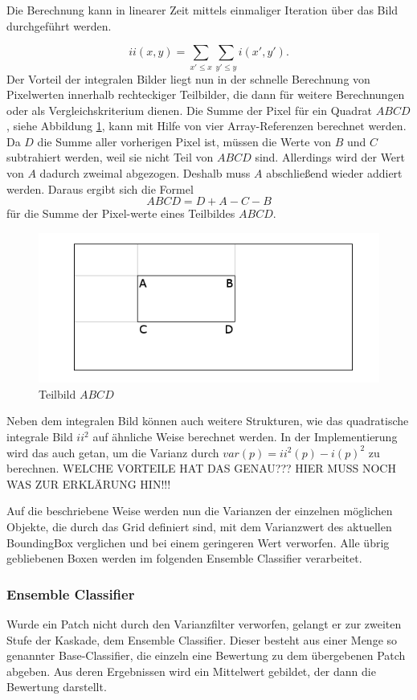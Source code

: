 	Die Berechnung kann in linearer Zeit mittels einmaliger Iteration über das Bild durchgeführt werden.

	$$ ii(x,y)=\underset{x'\leq x}{\sum}\underset{y'\leq y}{\sum}i(x',y'). $$
	Der Vorteil der integralen Bilder liegt nun in der schnelle Berechnung von Pixelwerten innerhalb rechteckiger Teilbilder, die dann für weitere Berechnungen oder als Vergleichskriterium dienen. Die Summe der Pixel für ein Quadrat $ABCD$, siehe Abbildung \ref{Subwindow}, kann mit Hilfe von vier Array-Referenzen berechnet werden. Da $D$ die Summe aller vorherigen Pixel ist, müssen die Werte von $B$ und $C$ subtrahiert werden, weil sie nicht Teil von $ABCD$ sind. Allerdings wird der Wert von $A$ dadurch zweimal abgezogen. Deshalb muss $A$ abschließend wieder addiert werden. Daraus ergibt sich die Formel $$ABCD=D+A-C-B$$ für die Summe der Pixel-werte eines Teilbildes $ABCD$.

	\begin{figure}
	\centering{}\includegraphics[scale=0.7]{../pictures/IntegralImage.png}\caption{Teilbild $ABCD$}
	\label{Subwindow}
	\end{figure}

	Neben dem integralen Bild können auch weitere Strukturen, wie das quadratische integrale Bild $ii^{2}$ auf ähnliche Weise berechnet werden. In der Implementierung wird das auch getan, um die Varianz durch $var(p)=ii^{2}(p)-i(p)^{2}$ zu berechnen. WELCHE VORTEILE HAT DAS GENAU??? HIER MUSS NOCH WAS ZUR ERKLÄRUNG HIN!!!

	Auf die beschriebene Weise werden nun die Varianzen der einzelnen möglichen Objekte, die durch das Grid definiert sind, mit dem Varianzwert des aktuellen BoundingBox verglichen und bei einem geringeren Wert verworfen. Alle übrig gebliebenen Boxen werden im folgenden Ensemble Classifier verarbeitet.

	\subsubsection{Ensemble Classifier}
	Wurde ein Patch nicht durch den Varianzfilter verworfen, gelangt er zur zweiten Stufe der Kaskade, dem Ensemble Classifier. Dieser besteht aus einer Menge so genannter Base-Classifier, die einzeln eine Bewertung zu dem übergebenen Patch abgeben. Aus deren Ergebnissen wird ein Mittelwert gebildet, der dann die Bewertung darstellt.

